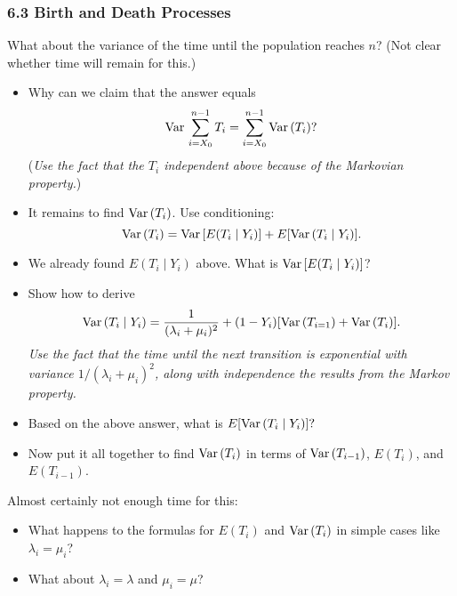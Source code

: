 \documentclass[handout]{beamer}
\def\Var{\mathop{\rm Var\,}\nolimits}
\def\startframe#1{\begin{frame}[t,fragile] \frametitle{\thedate \hfill {#1}} }
\begin{document}
\startframe{6.3 Birth and Death Processes}
What about the variance of the time until the population reaches $n$?
(Not clear whether time will remain for this.)
\begin{itemize}
\item Why can we claim that the answer equals 
\[
\Var \sum_{i=X_0}^{n-1} T_i =
\sum_{i=X_0}^{n-1} \Var(T_i)?
\]
({\em Use the fact that the $T_i$ independent above because of the Markovian 
property.})
\item It remains to find $\Var (T_i)$.  Use conditioning:
\[
\Var (T_i) = \Var [ E(T_i \mid Y_i)] + E[ \Var(T_i \mid Y_i)].
\]
\item We already found $E(T_i \mid Y_i)$ above.  What is $\Var[E(T_i \mid Y_i)]$?
\item Show how to derive
\[
\Var(T_i \mid Y_i) = \frac{1}{(\lambda_i+\mu_i)^2} + (1-Y_i)
[ \Var(T_{i=1}) + \Var(T_i)].
\]
{\em Use the fact that the time until the next transition is exponential with
variance $1/(\lambda_i+\mu_i)^2$, along with independence the results from the Markov 
property.}
\item Based on the above answer, what is $E[\Var(T_i \mid Y_i)]?$
\item Now put it all together to find $\Var(T_i)$ in terms of 
$\Var(T_{i-1})$, $E(T_i)$, and $E(T_{i-1})$.
\end{itemize}

\vspace{2ex}
Almost certainly not enough time for this:
\begin{itemize}
\item What happens to the formulas for $E(T_i)$ and $\Var(T_i)$
in simple cases like $\lambda_i=\mu_i$?
\item What about
$\lambda_i=\lambda$ and $\mu_i=\mu$?
\end{itemize}

\end{frame}



\end{document}
